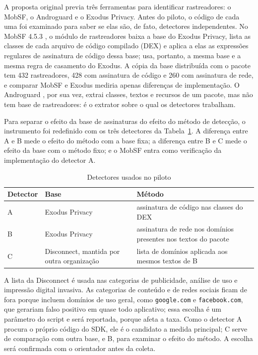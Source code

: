 \label{sec:deteccao}

A proposta original previa três ferramentas para identificar rastreadores: o MobSF, o Androguard e o Exodus Privacy. Antes do piloto, o código de cada uma foi examinado para saber se elas são, de fato, detectores independentes. No MobSF 4.5.3 \cite{mobsf2026}, o módulo de rastreadores baixa a base do Exodus Privacy, lista as classes de cada arquivo de código compilado (DEX) e aplica a elas as expressões regulares de assinatura de código dessa base; usa, portanto, a mesma base e a mesma regra de casamento do Exodus. A cópia da base distribuída com o pacote tem 432 rastreadores, 428 com assinatura de código e 260 com assinatura de rede, e comparar MobSF e Exodus mediria apenas diferenças de implementação. O Androguard \cite{androguard2026}, por sua vez, extrai classes, textos e recursos de um pacote, mas não tem base de rastreadores: é o extrator sobre o qual os detectores trabalham.

Para separar o efeito da base de assinaturas do efeito do método de detecção, o instrumento foi redefinido com os três detectores da Tabela~\ref{tab:detectores}. A diferença entre A e B mede o efeito do método com a base fixa; a diferença entre B e C mede o efeito da base com o método fixo; e o MobSF entra como verificação da implementação do detector A.

\begin{table}[htbp]
\centering
\small
\caption{Detectores usados no piloto}\label{tab:detectores}
\begin{tabularx}{\textwidth}{|l|>{\raggedright\arraybackslash}X|>{\raggedright\arraybackslash}X|}
\hline
\textbf{Detector} & \textbf{Base} & \textbf{Método} \\
\hline
A & Exodus Privacy & assinatura de código nas classes do DEX \\ \hline
B & Exodus Privacy & assinatura de rede nos domínios presentes nos textos do pacote \\ \hline
C & Disconnect, mantida por outra organização & lista de domínios aplicada aos mesmos textos de B \\ \hline
\end{tabularx}
\end{table}

A lista da Disconnect é usada nas categorias de publicidade, análise de uso e impressão digital invasiva. As categorias de conteúdo e de redes sociais ficam de fora porque incluem domínios de uso geral, como \texttt{google.\allowbreak{}com} e \texttt{facebook.\allowbreak{}com}, que gerariam falso positivo em quase todo aplicativo; essa escolha é um parâmetro do script e será reportada, porque afeta a taxa. Como o detector A procura o próprio código do SDK, ele é o candidato a medida principal; C serve de comparação com outra base, e B, para examinar o efeito do método. A escolha será confirmada com o orientador antes da coleta.

